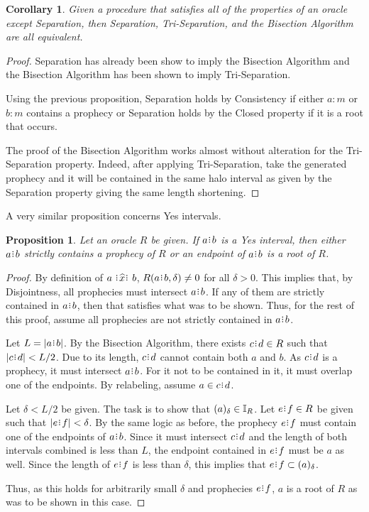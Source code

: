 \documentclass[12pt]{article}
\newtheorem{corollary}{Corollary}[section]
\newtheorem{proposition}{Proposition}[section]
\begin{document}
\begin{corollary}
    Given a procedure that satisfies all of the properties of an oracle except Separation, then Separation, Tri-Separation, and the Bisection Algorithm are all equivalent. 
\end{corollary}

\begin{proof}
    Separation has already been show to imply the Bisection Algorithm and the Bisection Algorithm has been shown to imply Tri-Separation. 

    Using the previous proposition, Separation holds by Consistency if either $a:m$ or $b:m$ contains a prophecy or Separation holds by the Closed property if it is a root that occurs. 

    The proof of the Bisection Algorithm works almost without alteration for the Tri-Separation property. Indeed, after applying Tri-Separation, take the generated prophecy and it will be contained in the same halo interval as given by the Separation property giving the same length shortening. 
\end{proof}


A very similar proposition concerns Yes intervals. 

\begin{proposition}\label{os-yescat}
    Let an oracle $R$ be given. If $a\rint b$ is a Yes interval, then either $a\rint b$ strictly contains a prophecy of $R$ or an endpoint of $a\rint b$ is a root of $R$. 
\end{proposition}

\begin{proof}
    By definition of $a \xora b$, $R(a\rint b, \delta) \neq 0$ for all $\delta > 0$. This implies that, by Disjointness, all prophecies must intersect $a\rint b$. If any of them are strictly contained in $a\rint b$, then that satisfies what was to be shown. Thus, for the rest of this proof, assume all prophecies are not strictly contained in $a\rint b$.

    Let $L = |a\rint b|$. By the Bisection Algorithm, there exists $c\rint d \in R$ such that $|c\rint d| < L/2$. Due to its length, $c\rint d$ cannot contain both $a$ and $b$. As $c\rint d$ is a prophecy, it must intersect $a\rint b$. For it not to be contained in it, it must overlap one of the endpoints. By relabeling, assume $a \in c\rint d$.
    
    Let $\delta < L/2$ be given. The task is to show that $(a)_{\delta} \in \mathbb{I}_R$. Let $e\rint f \in R$ be given such that $|e\rint f| < \delta$. By the same logic as before, the prophecy $e\rint f$ must contain one of the endpoints of $a\rint b$. Since it must intersect $c\rint d$ and the length of both intervals combined is less than $L$, the endpoint contained in $e\rint f$ must be $a$ as well. Since the length of $e\rint f$ is less than $\delta$, this implies that $e\rint f \subset \halo{a}$.

    Thus, as this holds for arbitrarily small $\delta$ and prophecies $e\rint f$, $a$ is a root of $R$ as was to be shown in this case. 
\end{proof}
\end{document}
